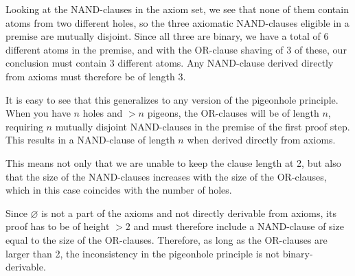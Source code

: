 Looking at the NAND-clauses in the axiom set, we see that none of them contain atoms from two different holes, so the three axiomatic NAND-clauses eligible in a premise are mutually disjoint.
Since all three are binary, we have a total of 6 different atoms in the premise, and with the OR-clause shaving of 3 of these, our conclusion must contain 3 different atoms.
Any NAND-clause derived directly from axioms must therefore be of length 3.\par
\begin{figure}[!h]
  \centering
  \begin{prooftree*}
  \end{prooftree*}
  \caption{}
  \label{fig:pigeonhole_not_binary}
\end{figure}
It is easy to see that this generalizes to any version of the pigeonhole principle.
When you have $n$ holes and $>n$ pigeons, the OR-clauses will be of length $n$, requiring $n$ mutually disjoint NAND-clauses in the premise of the first proof step.
This results in a NAND-clause of length $n$ when derived directly from axioms.

This means not only that we are unable to keep the clause length at 2, but also that the size of the NAND-clauses increases with the size of the OR-clauses, which in this case coincides with the number of holes.

Since $\varnothing$ is not a part of the axioms and not directly derivable from axioms, its proof has to be of height $>2$ and must therefore include a NAND-clause of size equal to the size of the OR-clauses.
Therefore, as long as the OR-clauses are larger than 2, the inconsistency in the pigeonhole principle is not binary-derivable.
